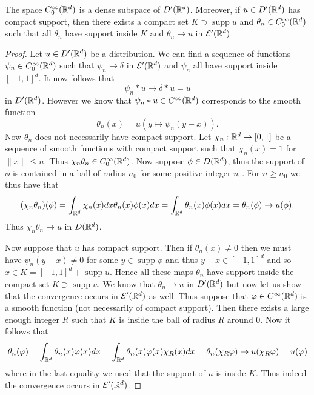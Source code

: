 \documentclass[twoside, a4paper, 10pt]{amsart}
\begin{document}
\begin{thm} \label{thm: approximate distribution by functions} The space $C_0^{\infty}(\mathbb{R}^d)$ is a dense subspace of $D'(\mathbb{R}^d)$. Moreover, if $u \in D'(\mathbb{R}^d)$ has compact support, then there exists a compact set $K \supset \operatorname{supp} u$ and $\theta_n \in C_0^{\infty}(\mathbb{R}^d)$  such that all $\theta_n$ have support inside $K$ and $\theta_n \to u$ in $\mathcal{E}'(\mathbb{R}^d)$.

\end{thm}

\begin{proof} Let $u \in D'(\mathbb{R}^d)$ be a distribution. We can find a sequence of functions $\psi_n \in C_0^{\infty}(\mathbb{R}^d)$ such that $\psi_n \to \delta$ in $\mathcal{E}'(\mathbb{R}^d)$ and $\psi_n$ all have support inside $[-1,1]^d$. It now follows that $$\psi_n * u \to \delta * u = u$$ in $D'(\mathbb{R}^d)$. However we know that $\psi_n * u \in C^{\infty}(\mathbb{R}^d)$ corresponds to the smooth function $$\theta_n(x) = u(y \mapsto \psi_n(y-x)).$$ Now $\theta_n$ does not necessarily have compact support. Let $\chi_n:\mathbb{R}^d \to [0,1]$ be a sequence of smooth functions with compact support such that $\chi_n(x)=1$ for $\|x \| \leq n$. Thus $\chi_n \theta_n \in C_0^{\infty}(\mathbb{R}^d)$. Now suppose $\phi \in D(\mathbb{R}^d)$, thus the support of $\phi$ is contained in a ball of radius $n_0$ for some positive integer $n_0$. For $n\geq n_0$ we thus have that $$(\chi_n\theta_n) (\phi) = \int_{\mathbb{R}^d} \chi_n(x) dx \theta_n(x) \phi(x) dx = \int_{\mathbb{R}^d} \theta_n(x)\phi(x) dx = \theta_n(\phi) \to u(\phi). $$ Thus $\chi_n \theta_n \to u$ in $D(\mathbb{R}^d)$.

Now suppose that $u$ has compact support. Then if $\theta_n(x) \neq 0$ then we must have $\psi_n(y-x) \neq 0$ for some $y \in \operatorname{supp}\phi$ and thus $y-x \in [-1,1]^d$ and so $x \in K = [-1,1]^d + \operatorname{supp} u$. Hence all these maps $\theta_n$ have support inside the compact set $K \supset \operatorname{supp} u$. We know that $\theta_n \to u$ in $D'(\mathbb{R}^d)$ but now let us show that the convergence occurs in $\mathcal{E}'(\mathbb{R}^d)$ as well. Thus suppose that $\varphi \in C^{\infty}(\mathbb{R}^d)$ is a smooth function (not necessarily of compact support). Then there exists a large enough integer $R$ such that $K$ is inside the ball of radius $R$ around $0$. Now it follows that $$\theta_n(\varphi) = \int_{\mathbb{R}^d} \theta_n(x)\varphi(x) dx = \int_{\mathbb{R}^d} \theta_n(x)\varphi(x)\chi_R(x) dx = \theta_n(\chi_R \varphi) \to u(\chi_R\varphi) = u(\varphi) $$ where in the last equality we used that the support of $u$ is inside $K$. Thus indeed the convergence occurs in $\mathcal{E}'(\mathbb{R}^d)$. \end{proof}
\end{document}
